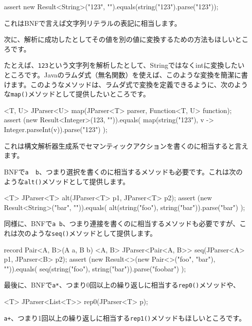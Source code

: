 \begin{codescreen}{}
assert new Result<String>("123", "").equals(string("123").parse("123"));
\end{codescreen}

これはBNFで言えば文字列リテラルの表記に相当します。

次に、解析に成功したとしてその値を別の値に変換するための方法もほしいところです。

たとえば、\texttt{123}という文字列を解析したとして、Stringではなくintに変換したいところです。Javaのラムダ式（無名関数）を使えば、このような変換を簡潔に書けます。このようなメソッドは、ラムダ式で変換を定義できるように、次のような\texttt{map()}メソッドとして提供したいところです。

\begin{codescreen}{}
<T, U> JParser<U> map(JParser<T> parser, Function<T, U> function);
assert (new Result<Integer>(123, "")).equals(
    map(string("123"), v -> Integer.parseInt(v)).parse("123")
);
\end{codescreen}

これは構文解析器生成系でセマンティックアクションを書くのに相当すると言えます。

BNFで\texttt{a\ \textbar{}\ b}、つまり選択を書くのに相当するメソッドも必要です。これは次のような\texttt{alt()}メソッドとして提供します。

\begin{codescreen}{}
<T> JParser<T> alt(JParser<T> p1, JParser<T> p2);
assert (new Result<String>("bar", "")).equals(
    alt(string("foo"), string("bar")).parse("bar")
);
\end{codescreen}

同様に、BNFで\texttt{a\ b}、つまり連接を書くのに相当するメソッドも必要ですが、これは次のような\texttt{seq()}メソッドとして提供します。

\begin{codescreen}{}
record Pair<A, B>(A a, B b){}
<A, B> JParser<Pair<A, B>> seq(JParser<A> p1, JParser<B> p2);
assert (new Result<>(new Pair<>("foo", "bar"), "")).equals(
    seq(string("foo"), string("bar")).parse("foobar")
);
\end{codescreen}

最後に、BNFで\texttt{a*}、つまり0回以上の繰り返しに相当する\texttt{rep0()}メソッドや、

\begin{codescreen}{}
<T> JParser<List<T>> rep0(JParser<T> p);
\end{codescreen}

\texttt{a+}、つまり1回以上の繰り返しに相当する\texttt{rep1()}メソッドもほしいところです。

